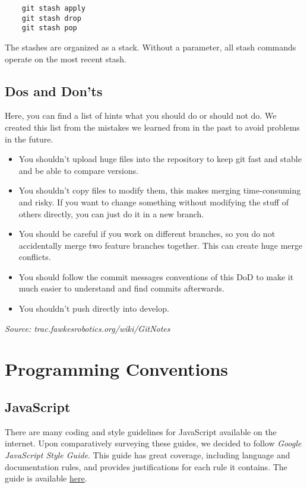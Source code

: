 \documentclass[twoside,12pt,a4paper]{article}
\begin{document}
\begin{lstlisting}
	git stash apply
	git stash drop
	git stash pop
\end{lstlisting}
\vspace*{0.25cm}

The stashes are organized as a stack. Without a parameter, all stash commands operate on the most recent stash.

\subsection{Dos and Don'ts}
Here, you can find a list of hints what you should do or should not do. We created this list from the mistakes we learned from in the past to avoid problems in the future.
\begin{itemize}
\item You shouldn't upload huge files into the repository to keep git fast and stable and be able to compare versions.
\item You shouldn't copy files to modify them, this makes merging time-consuming and risky. If you want to change something without modifying the stuff of others directly, you can just do it in a new branch.
\item You should be careful if you work on different branches, so you do not accidentally merge two feature branches together. This can create huge merge conflicts.
\item You should follow the commit messages conventions of this DoD to make it much easier to understand and find commits afterwards.
\item You shouldn't push directly into develop.
\end{itemize}
\label{sub:javascript}


\begin{flushright} \emph{Source: trac.fawkesrobotics.org/wiki/GitNotes} \end{flushright}

\section{Programming Conventions} %
\label{sec:programming_guidelines}

\subsection{JavaScript} %
\label{sub:javascript}

There are many coding and style guidelines for JavaScript available on the internet. Upon comparatively surveying these guides, we decided to follow \textit{Google JavaScript Style Guide}. This guide has great coverage, including language and documentation rules, and provides justifications for each rule it contains. The guide is available \href{https://google-styleguide.googlecode.com/svn/trunk/javascriptguide.xml}{here}.
\end{document}
